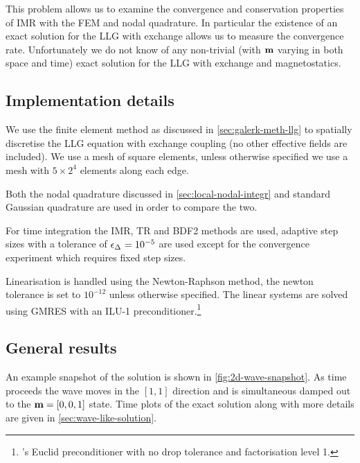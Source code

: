 This problem allows us to examine the convergence and conservation properties of IMR with the FEM and nodal quadrature.
In particular the existence of an exact solution for the LLG with exchange allows us to measure the convergence rate.
Unfortunately we do not know of any non-trivial (\ie with $\boldsymbol{\mathrm{m}}$ varying in both space and time) exact solution for the LLG with exchange and magnetostatics.


\subsection{Implementation details}

We use the finite element method as discussed in \cref{sec:galerk-meth-llg} to spatially discretise the LLG equation with exchange coupling (no other effective fields are included).
We use a mesh of square elements, %
unless otherwise specified we use a mesh with $5 \times 2^4$ elements along each edge.

Both the nodal quadrature discussed in \cref{sec:local-nodal-integr} and standard Gaussian quadrature are used in order to compare the two.

For time integration the IMR, TR and BDF2 methods are used, adaptive step sizes with a tolerance of $\epsilon_{\Delta_{}} = 10^{-5}$ are used except for the convergence experiment which requires fixed step sizes.

Linearisation is handled using the Newton-Raphson method, the newton tolerance is set to $10^{-12}$ unless otherwise specified.
The linear systems are solved using GMRES with an ILU-1 preconditioner.\footnote{\hypre's Euclid preconditioner \cite{hypre} with no drop tolerance and factorisation level 1.}


\subsection{General results}


An example snapshot of the solution is shown in \cref{fig:2d-wave-snapshot}.
As time proceeds the wave moves in the $[1,1]$ direction and is simultaneous damped out to the $\boldsymbol{\mathrm{m}} = [0,0,1]$ state.
Time plots of the exact solution along with more details are given in \cref{sec:wave-like-solution}.

